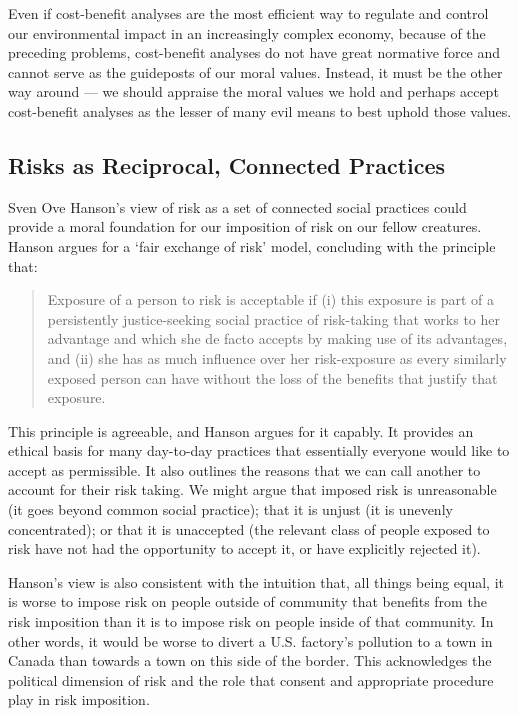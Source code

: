 Even if cost-benefit analyses are the most efficient way to regulate and
control our environmental impact in an increasingly complex economy, because of
the preceding problems, cost-benefit analyses do not have great normative force
and cannot serve as the guideposts of our moral values.  Instead, it must be
the other way around --- we should appraise the moral values we hold and
perhaps accept cost-benefit analyses as the lesser of many evil means to best
uphold those values.

\subsection{Risks as Reciprocal, Connected Practices}

Sven Ove Hanson’s view of risk as a set of connected social practices could
provide a moral foundation for our imposition of risk on our fellow creatures.
Hanson argues for a ‘fair exchange of risk’ model, concluding with the principle
that:

\begin{quote}
  Exposure of a person to risk is acceptable if (i) this exposure is part of a
  persistently justice-seeking social practice of risk-taking that works to her
  advantage and which she de facto accepts by making use of its advantages, and
  (ii) she has as much influence over her risk-exposure as every similarly
  exposed person can have without the loss of the benefits that justify that
  exposure.\autocite[107]{hansson_risk}
\end{quote}

This principle is agreeable, and Hanson argues for it capably. It provides an
ethical basis for many day-to-day practices that essentially everyone would
like to accept as permissible.  It also outlines the reasons that  we can call
another to account for their risk taking.  We might argue that imposed risk is
unreasonable (it goes beyond common social practice); that it is unjust (it is
unevenly concentrated); or that it is unaccepted (the relevant class of people
exposed to risk have not had the opportunity to accept it, or have explicitly
rejected it).

Hanson’s view is also consistent with the intuition that, all things being
equal, it is worse to impose risk on people outside of community that benefits
from the risk imposition than it is to impose risk on people inside of that
community. In other words, it would be worse to divert a U.S. factory’s
pollution to a town in Canada than towards a town on this side of the border.
This acknowledges the political dimension of risk and the role that consent and
appropriate procedure play in risk imposition.

